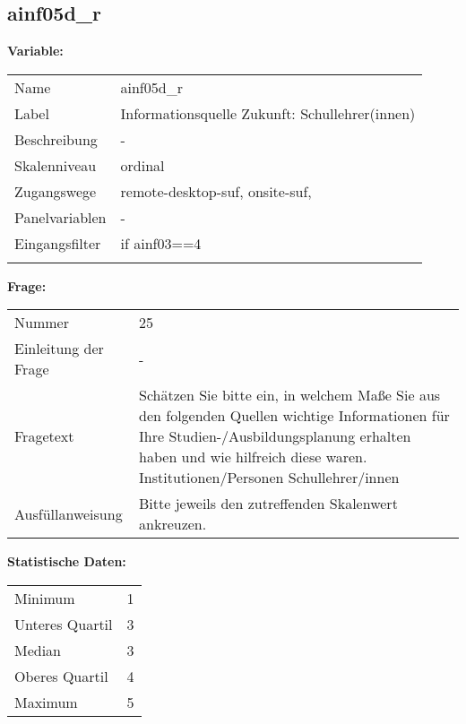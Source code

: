 	
	
	\subsection{ainf05d\_r}
	\label{subSection:ainf05d_r}

	\noindent\textbf{Variable:}\\
		\begin{tabular}{lL{11.3cm}}
			\label{tableVariable:ainf05d_r}
			Name & ainf05d\_r \\
			Label & Informationsquelle Zukunft: Schullehrer(innen) \\
			Beschreibung & - \\
			Skalenniveau & ordinal \\
			Zugangswege &
				remote-desktop-suf,
				onsite-suf,
 \\
			Panelvariablen & -
			 \\
			Eingangsfilter & if ainf03==4 \\
 \\
		\end{tabular}

		\vspace*{1 cm}
		\noindent\textbf{Frage:}\\
		\begin{tabular}{lL{11.3cm}}
			\label{tableQuestion:ainf05d_r}
			Nummer & 25 \\
			Einleitung der Frage & - \\
			Fragetext & Schätzen Sie bitte ein, in welchem Maße Sie aus den folgenden Quellen wichtige Informationen für Ihre Studien-/Ausbildungsplanung erhalten haben und wie hilfreich diese waren.
Institutionen/Personen
Schullehrer/innen \\
			Ausfüllanweisung & Bitte jeweils den zutreffenden Skalenwert ankreuzen. \\
		\end{tabular}


		\vspace*{1 cm}
		\noindent\textbf{Statistische Daten:}\\
			\begin{tabular}{ll}
				\label{tableStatistics:ainf05d_r}
					Minimum & 1 \\
					Unteres Quartil & 3 \\
					Median & 3 \\
					Oberes Quartil & 4 \\
					Maximum & 5 \\
			\end{tabular}



